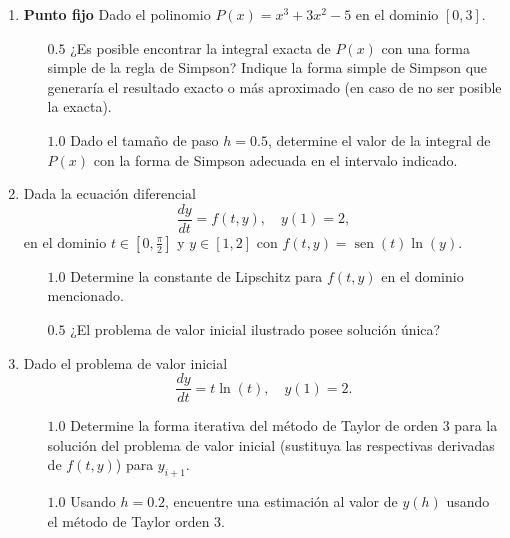 \documentclass[12pt]{article}
\renewcommand{\sin}{\operatorname{sen}}
\DeclareMathOperator{\sen}{sen}
\renewcommand{\sin}{\sen}
\begin{document}
  \begin{enumerate}[leftmargin=*,widest=9]
    \item \textbf{Punto fijo} Dado el polinomio $P(x) = x^3 + 3x^2 - 5$ en el dominio $[0, 3]$.
    \begin{itemize}
    \item[$0.5$] ¿Es posible encontrar la integral exacta de $P(x)$ con una forma simple de la regla de Simpson? Indique la forma simple de Simpson que generaría el resultado exacto o más aproximado (en caso de no ser posible la exacta).
    \vspace{1cm}
    \item[$1.0$] Dado el tamaño de paso $h= 0.5$, determine el valor de la integral de $P(x)$ con la forma de Simpson adecuada en el intervalo indicado.
    \vspace{4cm}
    \end{itemize}
 \item Dada la ecuación diferencial $$ \frac{dy}{dt} = f(t, y), \quad y(1)= 2,$$ en el dominio $t \in \left[0, \frac{\pi}{2} \right]$ y $y \in [1, 2]$ con $f(t, y) = \sin(t) \ln(y)$.
    \begin{itemize}
    \item[$1.0$] Determine la constante de Lipschitz para $f(t, y)$ en el dominio mencionado.
    \vspace{6cm}
    \item[$0.5$] ¿El problema de valor inicial ilustrado posee solución única?
    \vspace{.5cm}
    \end{itemize}
    \item Dado el problema de valor inicial $$ \frac{dy}{dt} = t\ln(t), \quad y(1)=2. $$
    \begin{itemize}
    \item[$1.0$] Determine la forma iterativa del método de Taylor de orden 3 para la solución del problema de valor inicial (sustituya las respectivas derivadas de $f(t, y)$) para $y_{i+1}$.
    \vspace{6cm}
    \item[$1.0$] Usando $h=0.2$, encuentre una estimación al valor de $y(h)$ usando el método de Taylor orden 3.
    \end{itemize}
  \end{enumerate}
\end{document}
